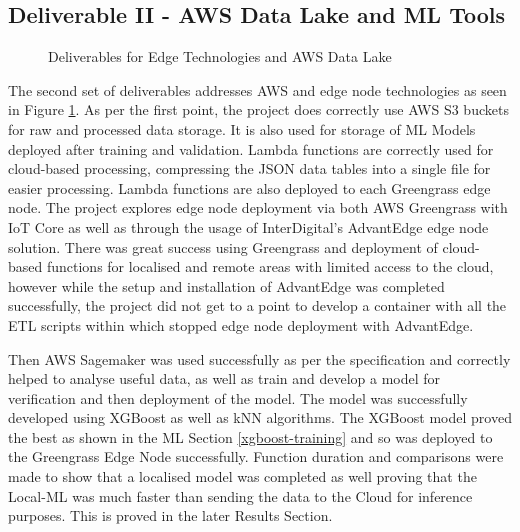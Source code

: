 \subsection{Deliverable II - AWS Data Lake and ML Tools}
\begin{figure}[ht]
    \centering
    \caption{Deliverables for Edge Technologies and AWS Data Lake}
    \label{fig:aws_edge_spec}
\end{figure}

The second set of deliverables addresses AWS and edge node technologies as seen in Figure \ref{fig:aws_edge_spec}. As per the first point, the project does correctly use AWS S3 buckets for raw and processed data storage. It is also used for storage of ML Models deployed after training and validation. Lambda functions are correctly used for cloud-based processing, compressing the JSON data tables into a single file for easier processing. Lambda functions are also deployed to each Greengrass edge node. The project explores edge node deployment via both AWS Greengrass with IoT Core as well as through the usage of InterDigital's AdvantEdge edge node solution. There was great success using Greengrass and deployment of cloud-based functions for localised and remote areas with limited access to the cloud, however while the setup and installation of AdvantEdge was completed successfully, the project did not get to a point to develop a container with all the ETL scripts within which stopped edge node deployment with AdvantEdge. 

Then AWS Sagemaker was used successfully as per the specification and correctly helped to analyse useful data, as well as train and develop a model for verification and then deployment of the model. The model was successfully developed using XGBoost as well as kNN algorithms. The XGBoost model proved the best as shown in the ML Section \ref{xgboost-training} and so was deployed to the Greengrass Edge Node successfully. Function duration and comparisons were made to show that a localised model was completed as well proving that the Local-ML was much faster than sending the data to the Cloud for inference purposes. This is proved in the later Results Section.

